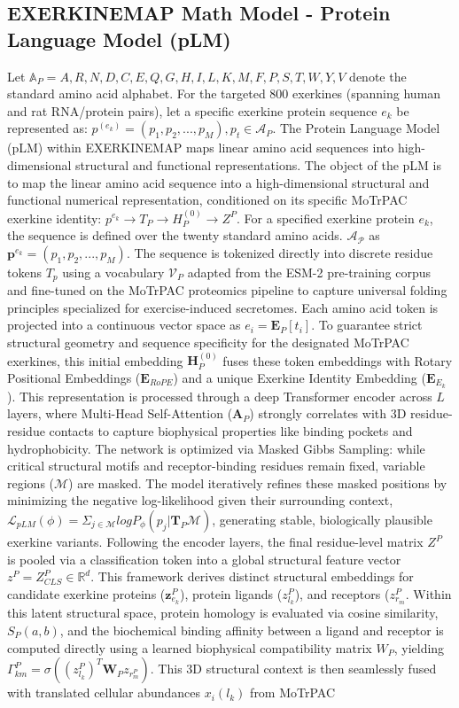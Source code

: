 \documentclass[11pt]{article}
\begin{document}
\subsection{EXERKINEMAP Math Model - Protein Language Model (pLM)}
Let $\mathbb{A}_P = {A,R,N,D,C,E,Q,G,H,I,L,K,M,F,P,S,T,W,Y,V}$ denote the standard amino acid alphabet. For the targeted 800 exerkines (spanning human and rat RNA/protein pairs), let a specific exerkine protein sequence $e_k$ be represented as: $ p^{(e_k)} = (p_1,p_2,...,p_M), p_t \in \mathcal{A}_P$. The Protein Language Model (pLM) within EXERKINEMAP maps linear amino acid sequences into high-dimensional structural and functional representations. The object of the pLM is to map the linear amino acid sequence into a high-dimensional structural and functional numerical representation, conditioned on its specific MoTrPAC exerkine identity: $p^{e_k} \rightarrow T_P \rightarrow H_P^{(0)} \rightarrow Z^P$. For a specified exerkine protein $e_k$, the sequence is defined over the twenty standard amino acids. $\mathcal{A_P}$ as $\textbf{p}^{e_k} = (p_1, p_2,...,p_M)$. The sequence is tokenized directly into discrete residue tokens $T_p$ using a vocabulary $\mathcal{V}_P$ adapted from the ESM-2 pre-training corpus and fine-tuned on the MoTrPAC proteomics pipeline to capture universal folding principles specialized for exercise-induced secretomes. Each amino acid token is projected into a continuous vector space as $e_i = \textbf{E}_P[t_i]$. To guarantee strict structural geometry and sequence specificity for the designated MoTrPAC exerkines, this initial embedding $\textbf{H}_P^{(0)}$ fuses these token embeddings with Rotary Positional Embeddings ($\textbf{E}_{RoPE}$) and a unique Exerkine Identity Embedding ($\textbf{E}_{E_k}$). This representation is processed through a deep Transformer encoder across $L$  layers, where Multi-Head Self-Attention ($\mathbf{A}_P$) strongly correlates with 3D residue-residue contacts to capture biophysical properties like binding pockets and hydrophobicity. The network is optimized via Masked Gibbs Sampling: while critical structural motifs and receptor-binding residues remain fixed, variable regions ($\mathcal{M}$) are masked. The model iteratively refines these masked positions by minimizing the negative log-likelihood given their surrounding context, $\mathcal{L}_{pLM}(\phi) = \Sigma_{j\in\mathcal{M}} logP_{\phi}(p_j | \mathbf{T}_P \mathcal{M})$, generating stable, biologically plausible exerkine variants. Following the encoder layers, the final residue-level matrix $Z^P$ is pooled via a classification token into a global structural feature vector $z^P = Z_{CLS}^P \in \mathbb{R}^d$. This framework derives distinct structural embeddings for candidate exerkine proteins ($\mathbf{z}_{e_k}^P$), protein ligands ($z_{l_k}^P$), and receptors ($z_{r_m}^P$. Within this latent structural space, protein homology is evaluated via cosine similarity, $S_P(a,b)$, and the biochemical binding affinity between a ligand and receptor is computed directly using a learned biophysical compatibility matrix $W_P$, yielding $\Gamma_{km}^P = \sigma((z_{l_k}^P)^T \textbf{W}_P {z_{r_m^P}})$. This 3D structural context is then seamlessly fused with translated cellular abundances $x_i(l_k)$ from MoTrPAC 
\end{document}
